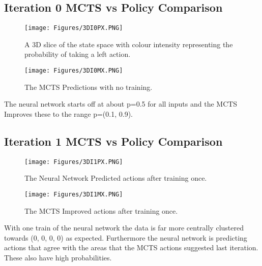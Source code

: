 \documentclass[11.7pt]{article}
\begin{document}
\begin{landscape}

\pagebreak
\subsection{Iteration 0 MCTS vs Policy Comparison}
\begin{figure}[H]
    \begin{minipage}{0.8\textwidth}
        \centering
        \texttt{[image: Figures/3DI0PX.PNG]}
        \caption{A 3D slice of the state space with colour intensity representing the probability of taking a left action.}
        \label{fig:3DI0PX}
    \end{minipage}
    \begin{minipage}{0.8\textwidth}
        \centering
        \texttt{[image: Figures/3DI0MX.PNG]}
        \caption{The MCTS Predictions with no training.}
        \label{fig:3DI0MX}
    \end{minipage}
\end{figure}

The neural network starts off at about p=0.5 for all inputs and the MCTS Improves these to the range p=(0.1, 0.9).

\pagebreak
\subsection{Iteration 1 MCTS vs Policy Comparison}
\begin{figure}[H]
    \begin{minipage}{0.8\textwidth}
        \centering
        \texttt{[image: Figures/3DI1PX.PNG]}
        \caption{The Neural Network Predicted actions after training once.}
        \label{fig:3DI1PX}
    \end{minipage}
    \begin{minipage}{0.8\textwidth}
        \centering
        \texttt{[image: Figures/3DI1MX.PNG]}
        \caption{The MCTS Improved actions after training once.}
        \label{fig:3DI1MX}
    \end{minipage}
\end{figure}

With one train of the neural network the data is far more centrally clustered towards (0, 0, 0, 0) as expected. Furthermore the neural network is predicting actions that agree with the areas that the MCTS actions suggested last iteration. These also have high probabilities. 


\end{landscape}
\end{document}

